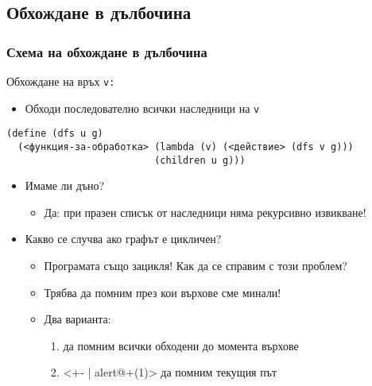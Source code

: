 \documentclass{beamer}
\begin{document}
\subsection{Обхождане в дълбочина}

\begin{frame}[fragile]
\frametitle{Схема на обхождане в дълбочина}
  Обхождане на връх \tt v:
  \begin{itemize}
  \item Обходи последователно всички наследници на \tt v
  \end{itemize}
  \pause
\begin{verbatim}
(define (dfs u g)
  (<функция-за-обработка> (lambda (v) (<действие> (dfs v g)))
                          (children u g)))
\end{verbatim}
  \pause
  \begin{itemize}[<+->]
  \item \alert{Имаме ли дъно?}
    \begin{itemize}
    \item Да:  при празен списък от наследници няма рекурсивно извикване!
    \end{itemize}
  \item \alert{Какво се случва ако графът е цикличен?}
    \begin{itemize}
    \item Програмата също зацикля! Как да се справим с този проблем?
    \item Трябва да помним през кои върхове сме минали!
    \item Два варианта:
      \begin{enumerate}
      \item да помним всички обходени до момента върхове
      \item<+- | alert@+(1)> да помним текущия път
      \end{enumerate}
    \end{itemize}
  \end{itemize}
\end{frame}
\end{document}
